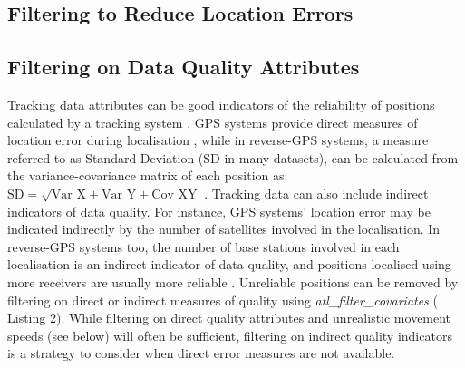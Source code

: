 \begin{refsection}[sorting=nyt]

    \section*{Filtering to Reduce Location Errors}

    \subsection*{Filtering on Data Quality Attributes}

    Tracking data attributes can be good indicators of the reliability of positions calculated by a tracking system \citep{beardsworth2021}.
    GPS systems provide direct measures of location error during localisation \citep[Horizontal Dilution of Precision, HDOP in GPS]{ranacher2016}, while  in reverse-GPS systems, a measure referred to as Standard Deviation (SD in many datasets), can be calculated from the variance-covariance matrix of each position as: $\text{SD} = \sqrt{\text{Var X} + \text{Var Y} + \text{Cov XY}}$ \citep[see details in][]{maccurdy2009, maccurdy2019, weiser2016, ranacher2016}.
    Tracking data can also include indirect indicators of data quality.
    For instance, GPS systems' location error may be indicated indirectly by the number of satellites involved in the localisation.
    In reverse-GPS systems too, the number of base stations involved in each localisation is an indirect indicator of data quality, and positions localised using more receivers are usually more reliable \citep[the minimum required for an ATLAS localisation is 3; see][]{weiser2016, beardsworth2021}.
    Unreliable positions can be removed by filtering on direct or indirect measures of quality using \textit{atl\_filter\_covariates} ({\color{red} Listing} 2).
    While filtering on direct quality attributes and unrealistic movement speeds (see below) will often be sufficient, filtering on indirect quality indicators is a strategy to consider when direct error measures are not available.


\end{refsection}
